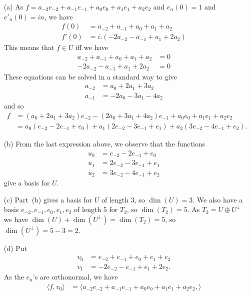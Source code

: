 \documentclass{amsart}
\newcommand{\ip}[1]     {\langle #1\rangle}
\newcommand{\op}        {\oplus}
\renewcommand{\:}       {\colon}
\theoremstyle{definition}
\renewenvironment{solution}{\SolutionAtEnd}{\endSolutionAtEnd}
\begin{document}
\begin{solution}
 \begin{itemize}
  \item[(a)] As $f=a_{-2}e_{-2}+a_{-1}e_{-1}+a_0e_0+a_1e_1+a_2e_2$ and
   $e_n(0)=1$ and $e'_n(0)=in$, we have 
   \begin{align*}
    f(0)  &= a_{-2} + a_{-1} + a_0 + a_1 + a_2 \\
    f'(0) &= i.(-2a_{-2} - a_{-1} + a_1 + 2a_2)
   \end{align*}
   This means that $f\in U$ iff we have
   \begin{align*}
    a_{-2} + a_{-1} + a_0 + a_1 + a_2  &= 0 \\
    -2a_{-2} - a_{-1} + a_1 + 2a_2 &= 0
   \end{align*}
   These equations can be solved in a standard way to give
   \begin{align*}
    a_{-2} &= a_0 + 2a_1 + 3 a_2 \\
    a_{-1} &= - 2a_0 - 3a_1 - 4a_2
   \end{align*}
   and so
   \begin{align*}
    f &= (a_0+2a_1+3a_2) e_{-2} - (2a_0+3a_1+4a_2) e_{-1} +
          a_0e_0 + a_1e_1 + a_2e_2 \\
      &= a_0(e_{-2}-2e_{-1}+e_0) + a_1(2e_{-2}-3e_{-1}+e_1) +
         a_2(3e_{-2}-4e_{-1}+e_2).
   \end{align*}
  \item[(b)] From the last expression above, we observe that the
   functions 
   \begin{align*}
    u_0 &= e_{-2}-2e_{-1}+e_0 \\
    u_1 &= 2e_{-2}-3e_{-1}+e_1 \\
    u_2 &= 3e_{-2}-4e_{-1}+e_2
   \end{align*}
   give a basis for $U$.
  \item[(c)] Part~(b) gives a basis for $U$ of length $3$, so
   $\dim(U)=3$.  We also have a basis $e_{-2},e_{-1},e_0,e_1,e_2$ of
   length $5$ for $T_2$, so $\dim(T_2)=5$.  As $T_2=U\op U^\perp$ we have
   $\dim(U)+\dim(U^\perp)=\dim(T_2)=5$, so $\dim(U^\perp)=5-3=2$.
  \item[(d)] Put 
   \begin{align*}
    v_0 &= e_{-2} + e_{-1} + e_0 + e_1 + e_2 \\
    v_1 &= -2e_{-2} -e_{-1} + e_1 + 2e_2.
   \end{align*}
   As the $e_n$'s are orthonormal, we have
   \begin{align*}
    \ip{f,v_0} &= \ip{a_{-2}e_{-2}+a_{-1}e_{-1}+a_0e_0+a_1e_1+a_2e_2,
}
\end{align*}
\end{itemize}
\end{solution}
\end{document}
